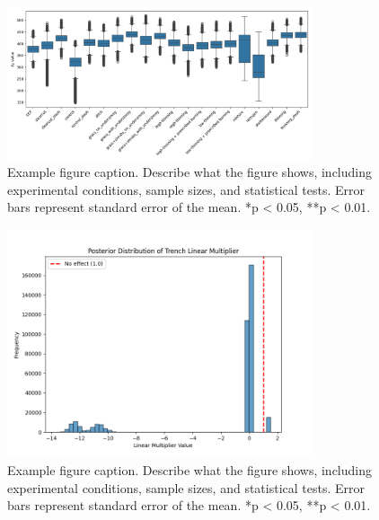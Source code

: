 \documentclass[12pt,a4paper]{article}
\begin{document}
\begin{figure}[H]
    \centering
    \includegraphics[width=0.8\textwidth]{"../ea_boxplot.png"}
    \caption{Example figure caption. Describe what the figure shows, including experimental conditions, sample sizes, and statistical tests. Error bars represent standard error of the mean. *p < 0.05, **p < 0.01.}
    \label{fig:ea_boxplot}
\end{figure}

\begin{figure}[H]
    \centering
    \includegraphics[width=0.8\textwidth]{"../linear_multiplier.png"}
    \caption{Example figure caption. Describe what the figure shows, including experimental conditions, sample sizes, and statistical tests. Error bars represent standard error of the mean. *p < 0.05, **p < 0.01.}
    \label{fig:linear_mult}
\end{figure}
\end{document}

